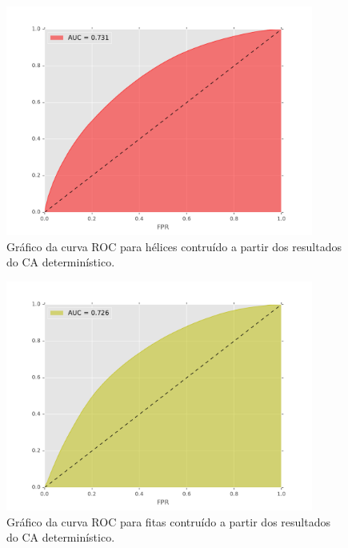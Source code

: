 \begin{figure}
	\centering
	\includegraphics[width=0.9\textwidth]{figures/figure_roc_helix.pdf}
	\caption{Gráfico da curva ROC para hélices contruído a partir dos resultados do CA determinístico.}
	\label{fig:roc_helix}
\end{figure}

\begin{figure}
	\centering
	\includegraphics[width=0.9\textwidth]{figures/figure_roc_strand.pdf}
	\caption{Gráfico da curva ROC para fitas contruído a partir dos resultados do CA determinístico.}
	\label{fig:roc_strand}
\end{figure}




